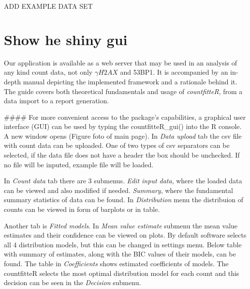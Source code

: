 ADD EXAMPLE DATA SET

\section{Show he shiny gui}

Our application is available as a web server that may be used in an analysis of any kind count data, not only $\gamma H2AX$ and 53BP1. It is accompanied by an in-depth manual depicting the implemented framework and a rationale behind it. The guide covers both theoretical fundamentals and usage of \emph{countfitteR}, from a data import to a report generation.

####
For more convenient access to the package’s capabilities, a graphical user interface (GUI) can be used by typing the countfitteR\_gui() into the R console. A new window opens (Figure foto of main page). In \textit{Data upload} tab the csv file with count data can be uploaded. One of two types of csv separators can be selected, if the data file does not have a header the box should be unchecked. If no file will be inputed, example file will be loaded.

In \textit{Count data} tab there are 3 submenus. \textit{Edit input data}, where the loaded data can be viewed and also modified if needed. \textit{Summary}, where the fundamental summary statistics of data can be found. In \textit{Distribution} menu the distribuion of counts can be viewed in form of barplots or in table.

Another tab is \textit{Fitted models}. In \textit{Mean value estimate} submenu the mean value estimates and their confidence can be viewed on  plots. By default software selects all 4 distribution models, but this can be changed in settings menu. Below table with summary of estimates, along with the BIC values of their models, can be found. The table in \textit{Coefficients} shows estimated coefficients of models. The countfitteR selects the most optimal distribution model for each count and this decision can be seen in the \textit{Decision} submenu.




